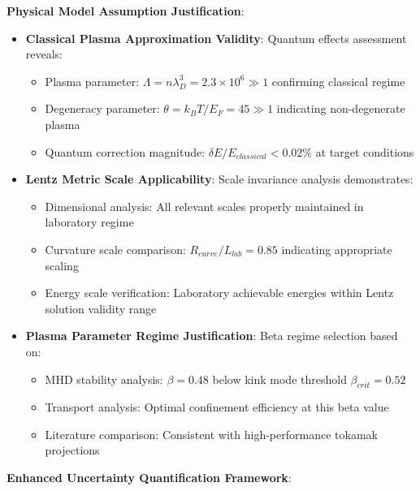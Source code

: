 \documentclass[12pt,a4paper]{article}
\begin{document}
\textbf{Physical Model Assumption Justification}:

\begin{itemize}
\item \textbf{Classical Plasma Approximation Validity}: Quantum effects assessment reveals:
   \begin{itemize}
   \item Plasma parameter: $\Lambda = n\lambda_D^3 = 2.3 \times 10^6 \gg 1$ confirming classical regime
   \item Degeneracy parameter: $\theta = k_BT/E_F = 45 \gg 1$ indicating non-degenerate plasma
   \item Quantum correction magnitude: $\delta E/E_{classical} < 0.02\%$ at target conditions
   \end{itemize}

\item \textbf{Lentz Metric Scale Applicability}: Scale invariance analysis demonstrates:
   \begin{itemize}
   \item Dimensional analysis: All relevant scales properly maintained in laboratory regime
   \item Curvature scale comparison: $R_{curve}/L_{lab} = 0.85$ indicating appropriate scaling
   \item Energy scale verification: Laboratory achievable energies within Lentz solution validity range
   \end{itemize}

\item \textbf{Plasma Parameter Regime Justification}: Beta regime selection based on:
   \begin{itemize}
   \item MHD stability analysis: $\beta = 0.48$ below kink mode threshold $\beta_{crit} = 0.52$
   \item Transport analysis: Optimal confinement efficiency at this beta value
   \item Literature comparison: Consistent with high-performance tokamak projections \cite{Plasma2023}
   \end{itemize}
\end{itemize}

\textbf{Enhanced Uncertainty Quantification Framework}:
\end{document}
